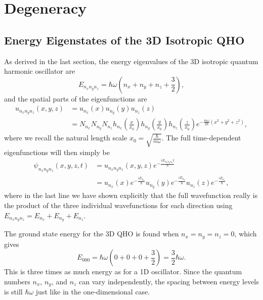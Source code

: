 \documentclass[../quantum_mechanics.tex]{subfiles}
\begin{document}
    \section{Degeneracy}\label{sec:degeneracy}
        \subsection{Energy Eigenstates of the 3D Isotropic QHO}\label{subsec:energy-eigenstates-of-the-3d-qho}
            As derived in the last section, the energy eigenvalues of the 3D isotropic quantum harmonic oscillator are
            \begin{equation}
                E_{n_xn_yn_z}=\hbar\omega\left(n_x+n_y+n_z+\frac{3}{2}\right),
            \end{equation}
            and the spatial parts of the eigenfunctions are
            \begin{align}
                u_{n_xn_yn_z}(x,y,z)&=u_{n_x}(x)u_{n_y}(y)u_{n_z}(z)\\
                &=N_{n_x}N_{n_y}N_{n_z}h_{n_x}\left(\frac{x}{x_0}\right)h_{n_y}\left(\frac{y}{x_0}\right)h_{n_z}\left(\frac{z}{x_0}\right)e^{-\frac{m\omega}{2\hbar}(x^2+y^2+z^2)},
            \end{align}
            where we recall the natural length scale $x_0=\sqrt{\frac{\hbar}{m\omega}}$.
            The full time-dependent eigenfunctions will then simply be
            \begin{align}
                \psi_{n_xn_yn_z}(x,y,z,t)&=u_{n_xn_yn_z}(x,y,z)e^{-\frac{iE_{n_xn_yn_z}t}{\hbar}}\\
                &=u_{n_x}(x)e^{-\frac{iE_{n_x}}{\hbar}}u_{n_y}(y)e^{-\frac{iE_{n_y}}{\hbar}}u_{n_z}(z)e^{-\frac{iE_{n_z}}{\hbar}},
            \end{align}
            where in the last line we have shown explicitly that the full wavefunction really is the product of the three individual wavefunctions for each direction using $E_{n_xn_yn_z}=E_{n_x}+E_{n_y}+E_{n_z}$.

            The ground state energy for the 3D QHO is found when $n_x=n_y=n_z=0$, which gives
            \begin{equation}
                E_{000}=\hbar\omega\left(0+0+0+\frac{3}{2}\right)=\frac{3}{2}\hbar\omega.
            \end{equation}
            This is three times as much energy as for a 1D oscillator.
            Since the quantum numbers $n_x$, $n_y$, and $n_z$ can vary independently, the spacing between energy levels is still $\hbar\omega$ just like in the one-dimensional case.
\end{document}
